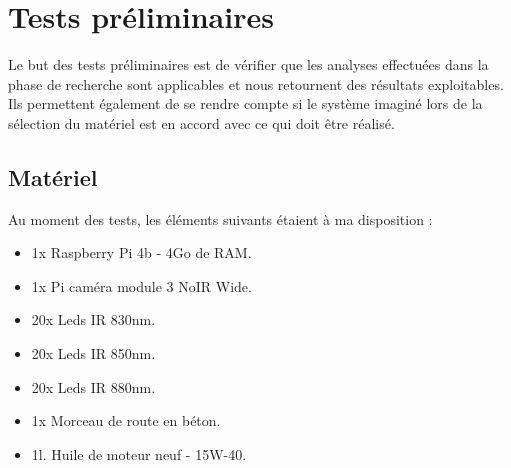 \section{Tests préliminaires \label{test_vision}}
Le but des tests préliminaires est de vérifier que les analyses effectuées dans la phase de recherche sont applicables et nous retournent
des résultats exploitables. Ils permettent également de se rendre compte si le système imaginé lors de la sélection du matériel est en accord avec
ce qui doit être réalisé.
\subsection{Matériel}
Au moment des tests, les éléments suivants étaient à ma disposition :
\begin{itemize}
    \item 1x Raspberry Pi 4b - 4Go de RAM.
    \item 1x Pi caméra module 3 NoIR Wide.
    \item 20x Leds IR 830nm.
    \item 20x Leds IR 850nm.
    \item 20x Leds IR 880nm.
    \item 1x Morceau de route en béton.
    \item 1l. Huile de moteur neuf - 15W-40.
\end{itemize}

